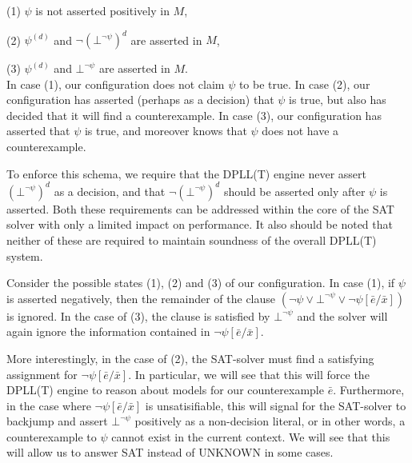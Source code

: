 \documentclass{llncs}
\begin{document}
(1) $\psi$ is not asserted positively in $M$, 

(2) $\psi^{(d)}$ and $\neg (\bot^{\neg \psi})^d$ are asserted in $M$, 

(3) $\psi^{(d)}$ and $\bot^{\neg \psi}$ are asserted in $M$. \\

In case (1), our configuration does not claim $\psi$ to be true.
In case (2), our configuration has asserted (perhaps as a decision) that $\psi$ is true, but also has decided that it will find a counterexample.
In case (3), our configuration has asserted that $\psi$ is true, and moreover knows that $\psi$ does not have a counterexample.

To enforce this schema, we require that the DPLL(T) engine never assert $(\bot^{\neg \psi})^d$ as a decision, and that $\neg (\bot^{\neg \psi})^d$ should be asserted only after $\psi$ is asserted.
Both these requirements can be addressed within the core of the SAT solver with only a limited impact on performance.
It also should be noted that neither of these are required to maintain soundness of the overall DPLL(T) system.


Consider the possible states (1), (2) and (3) of our configuration.
In case (1), if $\psi$ is asserted negatively, then the remainder of the clause $( \neg \psi \vee \bot^{\neg \psi} \vee \neg \psi[\bar{e}/\bar{x}])$ is ignored.
In the case of (3), the clause is satisfied by $\bot^{\neg \psi}$ and the solver will again ignore the information contained in $\neg \psi[\bar{e}/\bar{x}]$.

More interestingly, in the case of (2), the SAT-solver must find a satisfying assignment for $\neg \psi[\bar{e}/\bar{x}]$.
In particular, we will see that this will force the DPLL(T) engine to reason about models for our counterexample $\bar{e}$.
Furthermore, in the case where $\neg \psi[\bar{e}/\bar{x}]$ is unsatisifiable, this will signal for the SAT-solver to backjump and assert $\bot^{\neg \psi}$ positively as a non-decision literal, or in other words, a counterexample to $\psi$ cannot exist in the current context.
We will see that this will allow us to answer SAT instead of UNKNOWN in some cases.
\end{document}
